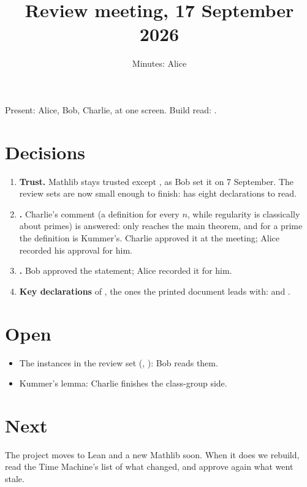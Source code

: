
\title{\bfseries Review meeting, 17 September 2026}
\author{Minutes: Alice}
\date{}

\maketitle
\thispagestyle{empty}
\vspace{-2em}
Present: Alice, Bob, Charlie, at one screen. Build read: .

\section{Decisions}
\begin{enumerate}
\item \textbf{Trust.} Mathlib stays trusted except , as Bob set it on
  7 September. The review sets are now small enough to finish:  has eight
  declarations to read.
\item \textbf{.} Charlie's comment (a definition for every $n$, while
  regularity is classically about primes) is answered: only  reaches the main
  theorem, and for a prime the definition is Kummer's. Charlie approved it at the meeting;
  Alice recorded his approval for him.
\item \textbf{.} Bob approved the statement; Alice recorded it for him.
\item \textbf{Key declarations} of , the ones the printed document leads with:
   and .
\end{enumerate}

\section{Open}
\begin{itemize}
\item The instances in the review set (,
  ): Bob reads them.
\item Kummer's lemma: Charlie finishes the class-group side.
\end{itemize}

\section{Next}
The project moves to Lean  and a new Mathlib soon. When it does we rebuild,
read the Time Machine's list of what changed, and approve again what went stale.

\fictional

